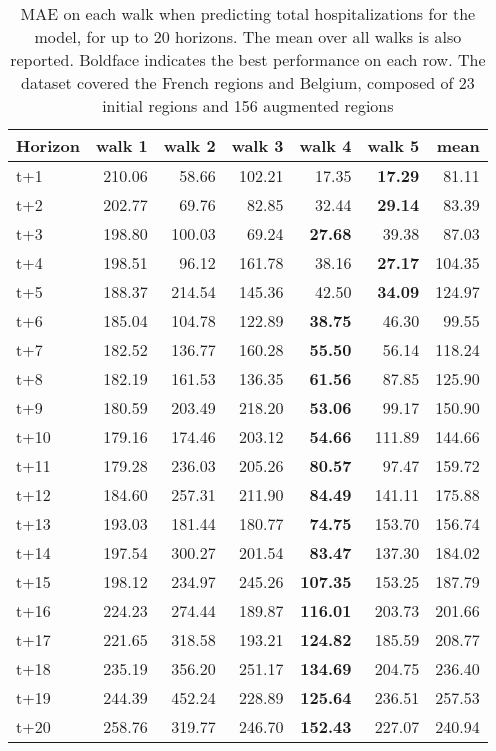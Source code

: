 \begin{table}[H]
\centering
\caption{MAE on each walk when predicting total hospitalizations for the model, for up to 20 horizons. The mean over all walks is also reported. Boldface indicates the best performance on each row. The dataset covered the French regions and Belgium, composed of 23 initial regions and 156 augmented regions }
\label{tab:MAE_walk_dense_model}
\begin{tabular}{lrrrrrr}
\toprule
Horizon &  walk 1 &  walk 2 &  walk 3 &  walk 4 &  walk 5 &   mean \\
\midrule
t+1  & 210.06  & 58.66  & 102.21  & 17.35  & \textbf{17.29}  & 81.11  \\
t+2  & 202.77  & 69.76  & 82.85  & 32.44  & \textbf{29.14}  & 83.39  \\
t+3  & 198.80  & 100.03  & 69.24  & \textbf{27.68}  & 39.38  & 87.03  \\
t+4  & 198.51  & 96.12  & 161.78  & 38.16  & \textbf{27.17}  & 104.35  \\
t+5  & 188.37  & 214.54  & 145.36  & 42.50  & \textbf{34.09}  & 124.97  \\
t+6  & 185.04  & 104.78  & 122.89  & \textbf{38.75}  & 46.30  & 99.55  \\
t+7  & 182.52  & 136.77  & 160.28  & \textbf{55.50}  & 56.14  & 118.24  \\
t+8  & 182.19  & 161.53  & 136.35  & \textbf{61.56}  & 87.85  & 125.90  \\
t+9  & 180.59  & 203.49  & 218.20  & \textbf{53.06}  & 99.17  & 150.90  \\
t+10  & 179.16  & 174.46  & 203.12  & \textbf{54.66}  & 111.89  & 144.66  \\
t+11  & 179.28  & 236.03  & 205.26  & \textbf{80.57}  & 97.47  & 159.72  \\
t+12  & 184.60  & 257.31  & 211.90  & \textbf{84.49}  & 141.11  & 175.88  \\
t+13  & 193.03  & 181.44  & 180.77  & \textbf{74.75}  & 153.70  & 156.74  \\
t+14  & 197.54  & 300.27  & 201.54  & \textbf{83.47}  & 137.30  & 184.02  \\
t+15  & 198.12  & 234.97  & 245.26  & \textbf{107.35}  & 153.25  & 187.79  \\
t+16  & 224.23  & 274.44  & 189.87  & \textbf{116.01}  & 203.73  & 201.66  \\
t+17  & 221.65  & 318.58  & 193.21  & \textbf{124.82}  & 185.59  & 208.77  \\
t+18  & 235.19  & 356.20  & 251.17  & \textbf{134.69}  & 204.75  & 236.40  \\
t+19  & 244.39  & 452.24  & 228.89  & \textbf{125.64}  & 236.51  & 257.53  \\
t+20  & 258.76  & 319.77  & 246.70  & \textbf{152.43}  & 227.07  & 240.94  \\

\bottomrule
\end{tabular}
\end{table}
